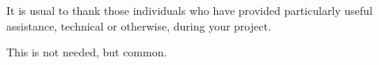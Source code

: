 It is usual to thank those individuals who have provided particularly useful assistance, technical or otherwise, during your project.

This is not needed, but common.